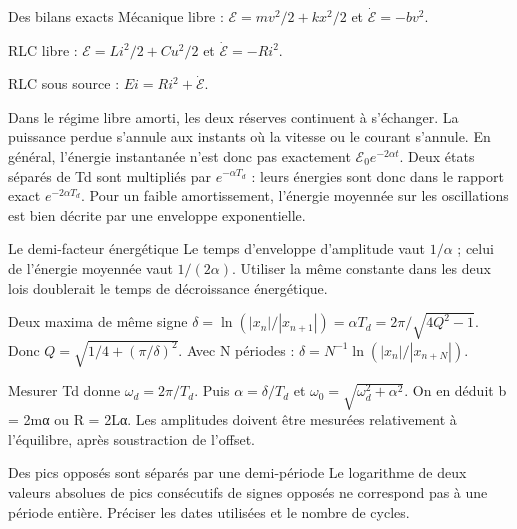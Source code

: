 \begin{loi}{Des bilans exacts}
Mécanique libre : $\mathcal E=mv^2/2+kx^2/2$ et $\dot{\mathcal E}=-bv^2$.\par RLC libre : $\mathcal E=Li^2/2+Cu^2/2$ et $\dot{\mathcal E}=-Ri^2$.\par RLC sous source : $Ei=Ri^2+\dot{\mathcal E}$.
\end{loi}
Dans le régime libre amorti, les deux réserves continuent à s’échanger. La puissance perdue s’annule aux instants où la vitesse ou le courant s’annule. En général, l’énergie instantanée n’est donc pas exactement $\mathcal E_0e^{-2\alpha t}$.
Deux états séparés de Td sont multipliés par $e^{-\alpha T_d}$ : leurs énergies sont donc dans le rapport exact $e^{-2\alpha T_d}$. Pour un faible amortissement, l’énergie moyennée sur les oscillations est bien décrite par une enveloppe exponentielle.
\begin{piege}{Le demi-facteur énergétique}
Le temps d’enveloppe d’amplitude vaut $1/\alpha$ ; celui de l’énergie moyennée vaut $1/(2\alpha)$. Utiliser la même constante dans les deux lois doublerait le temps de décroissance énergétique.
\end{piege}


\begin{loi}{Deux maxima de même signe}
$\delta=\ln(|x_n|/|x_{n+1}|)=\alpha T_d=2\pi/\sqrt{4Q^2-1}$. Donc $Q=\sqrt{1/4+(\pi/\delta)^2}$. Avec N périodes : $\delta=N^{-1}\ln(|x_n|/|x_{n+N}|)$.
\end{loi}
Mesurer Td donne $\omega_d=2\pi/T_d$. Puis $\alpha=\delta/T_d$ et $\omega_0=\sqrt{\omega_d^2+\alpha^2}$. On en déduit b = 2mα ou R = 2Lα. Les amplitudes doivent être mesurées relativement à l’équilibre, après soustraction de l’offset.
\begin{piege}{Des pics opposés sont séparés par une demi-période}
Le logarithme de deux valeurs absolues de pics consécutifs de signes opposés ne correspond pas à une période entière. Préciser les dates utilisées et le nombre de cycles.
\end{piege}


